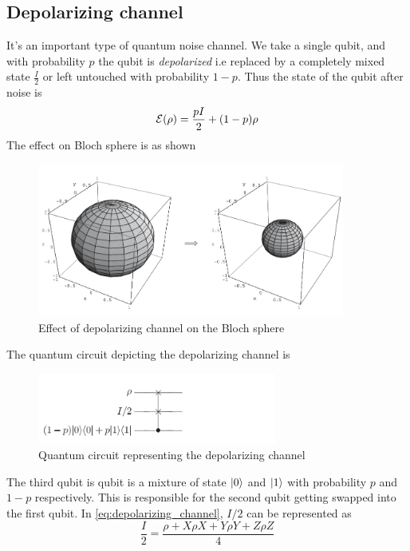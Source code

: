 \subsection{Depolarizing channel}
It's an important type of quantum noise channel. We take a single qubit, and with probability $p$ the qubit is \textit{depolarized} i.e replaced by a completely mixed state $\frac{I}{2}$ or left untouched with probability $1-p$. Thus the state of the qubit after noise is
\begin{equation}
    \operatorname{\mathcal{E}}(\rho) = \frac{pI}{2} + (1-p)\rho
    \label{eq:depolarizing_channel}
\end{equation}
The effect on Bloch sphere is as shown
\begin{figure}[H]
    \centering
    \includegraphics[width=0.9\textwidth]{images/depolarizing_bloch.png} 
    \caption{Effect of depolarizing channel on the Bloch sphere}
    \label{fig:depolarizing_bloch}
\end{figure}
The quantum circuit depicting the depolarizing channel is
\begin{figure}[H]
    \centering
    \includegraphics[width=0.7\textwidth]{images/depolarizing_circuit.png}
    \caption{Quantum circuit representing the depolarizing channel}
    \label{fig:depolarizing-circuit}
\end{figure}
The third qubit is qubit is a mixture of state $\ket{0}$ and $\ket{1}$ with probability $p$ and $1-p$ respectively. This is responsible for the second qubit getting swapped into the first qubit. In \ref{eq:depolarizing_channel}, $I/2$ can be represented as
\begin{equation}
    \frac{I}{2} = \frac{\rho + X \rho X + Y \rho Y + Z \rho Z}{4}
\end{equation}
